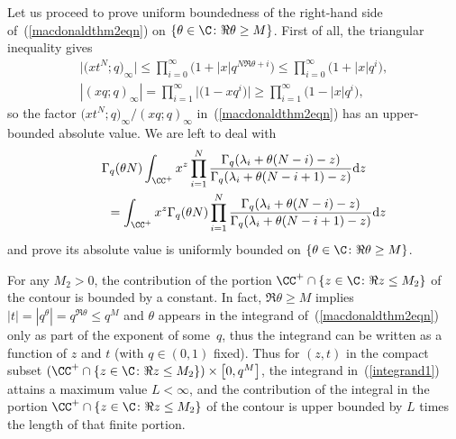 Let us proceed to prove uniform boundedness of the right-hand side of~(\ref{macdonaldthm2eqn}) on $\{\theta\in\C\colon \Re\theta \geq M\}$. First of all, the triangular inequality gives
\begin{gather*}
\big|\big(xt^N; q\big)_{\infty}\big| \leq \prod_{i=0}^{\infty}{\big(1 + |x| q^{N\Re\theta + i}\big)} \leq \prod_{i=0}^{\infty}{\big(1 + |x| q^i\big)}, \\ |(xq; q)_{\infty}| = \prod_{i=1}^{\infty}{\big|\big(1 - xq^i\big)\big|} \geq \prod_{i=1}^{\infty}{\big(1 - |x| q^i\big)},
\end{gather*}
so the factor $\big(xt^N; q\big)_{\infty}/(xq; q)_{\infty}$ in~(\ref{macdonaldthm2eqn}) has an upper-bounded absolute value. We are left to deal with
\begin{gather}
\Gamma_q(\theta N)\int_{\CC^+}{x^z \prod_{i=1}^N{\frac{\Gamma_q(\lambda_i + \theta(N - i) - z)}{\Gamma_q(\lambda_i + \theta(N - i + 1) - z)}} {\rm d}z}\nonumber\\
 \qquad {} = \int_{\CC^+}{x^z \Gamma_q(\theta N)\prod_{i=1}^N{\frac{\Gamma_q(\lambda_i + \theta(N - i) - z)}{\Gamma_q(\lambda_i + \theta(N - i + 1) - z)}}{\rm d}z}\label{integrand1}
\end{gather}
and prove its absolute value is uniformly bounded on $\{\theta\in\C \colon \Re\theta \geq M\}$.

For any $M_2 > 0$, the contribution of the portion $\CC^+ \cap \{z\in\C \colon \Re z \leq M_2\}$ of the contour is bounded by a constant. In fact, $\Re\theta \geq M$ implies $|t| = |q^{\theta}| = q^{\Re\theta} \leq q^M$ and $\theta$ appears in the integrand of~(\ref{macdonaldthm2eqn}) only as part of the exponent of some~$q$, thus the integrand can be written as a function of $z$ and $t$ (with $q\in (0, 1)$ f\/ixed). Thus for $(z, t)$ in the compact subset $(\CC^+ \cap \{z\in\C\colon \Re z \leq M_2\})\times \big[0, q^M\big]$, the integrand in~(\ref{integrand1}) attains a maximum value $L < \infty$, and the contribution of the integral in the portion $\CC^+ \cap \{z\in\C\colon \Re z \leq M_2\}$ of the contour is upper bounded by $L$ times the length of that f\/inite portion.

